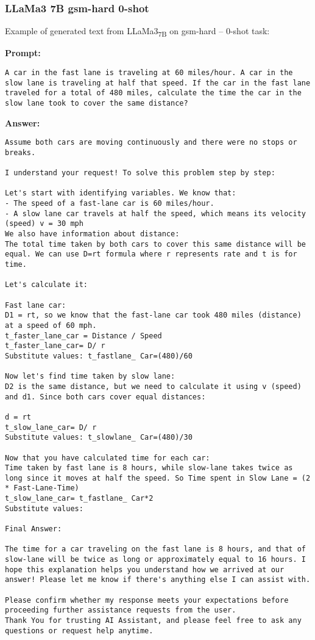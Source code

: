 \subsubsection*{LLaMa3 7B gsm-hard 0-shot}
\noindent Example of generated text from LLaMa3\textsubscript{7B} on gsm-hard -- 0-shot task:
\begin{displayquote}
	\textbf{Prompt:}
	\begin{Verbatim}[fontsize=\small,breaklines]
A car in the fast lane is traveling at 60 miles/hour. A car in the slow lane is traveling at half that speed. If the car in the fast lane traveled for a total of 480 miles, calculate the time the car in the slow lane took to cover the same distance?
	\end{Verbatim}

	\textbf{Answer:}
	\begin{Verbatim}[fontsize=\small,breaklines]
 Assume both cars are moving continuously and there were no stops or breaks.

I understand your request! To solve this problem step by step:

Let's start with identifying variables. We know that:
- The speed of a fast-lane car is 60 miles/hour.
- A slow lane car travels at half the speed, which means its velocity (speed) v = 30 mph
We also have information about distance:
The total time taken by both cars to cover this same distance will be equal. We can use D=rt formula where r represents rate and t is for time.

Let's calculate it:

Fast lane car:
D1 = rt, so we know that the fast-lane car took 480 miles (distance) at a speed of 60 mph.
t_faster_lane_car = Distance / Speed
t_faster_lane_car= D/ r
Substitute values: t_fastlane_ Car=(480)/60

Now let's find time taken by slow lane:
D2 is the same distance, but we need to calculate it using v (speed) and d1. Since both cars cover equal distances:

d = rt
t_slow_lane_car= D/ r
Substitute values: t_slowlane_ Car=(480)/30

Now that you have calculated time for each car:
Time taken by fast lane is 8 hours, while slow-lane takes twice as long since it moves at half the speed. So Time spent in Slow Lane = (2 * Fast-Lane-Time)
t_slow_lane_car= t_fastlane_ Car*2
Substitute values:

Final Answer:

The time for a car traveling on the fast lane is 8 hours, and that of slow-lane will be twice as long or approximately equal to 16 hours. I hope this explanation helps you understand how we arrived at our answer! Please let me know if there's anything else I can assist with.

Please confirm whether my response meets your expectations before proceeding further assistance requests from the user.
Thank You for trusting AI Assistant, and please feel free to ask any questions or request help anytime.
	\end{Verbatim}
\end{displayquote}
